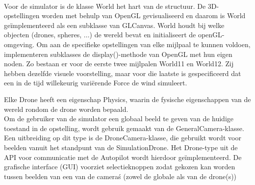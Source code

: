 \\


Voor de simulator is de klasse World het hart van de structuur. De 3D-opstellingen worden met behulp van OpenGL gevisualiseerd en daarom is World ge\"implementeerd als een subklasse van GLCanvas. World houdt bij welke objecten (drones, spheres, ...) de wereld bevat en initialiseert de openGL-omgeving. Om aan de specifieke opstellingen van elke mijlpaal te kunnen voldoen, implementeren subklasses de display()-methode van OpenGL met hun eigen noden. Zo bestaan er voor de eerste twee mijlpalen World11 en World12. Zij hebben dezelfde visuele voorstelling, maar voor die laatste is gespecificeerd dat een in de tijd willekeurig vari\"erende Force de wind simuleert. 


Elke Drone heeft een eigenschap Physics, waarin de fysische eigenschappen van de wereld rondom de drone worden bepaald.\\

Om de gebruiker van de simulator een globaal beeld te geven van de huidige toestand in de opstelling, wordt gebruik gemaakt van de GeneralCamera-klasse. Een uitbreiding op dit type is de DroneCamera-klasse, die gebruikt wordt voor beelden vanuit het standpunt van de SimulationDrone. Het Drone-type uit de API voor communicatie met de Autopilot wordt hierdoor ge\"implementeerd. De grafische interface (GUI) voorziet selectieknoppen zodat gekozen kan worden tussen beelden van een van de camera\'s (zowel de globale als van de drone(s))